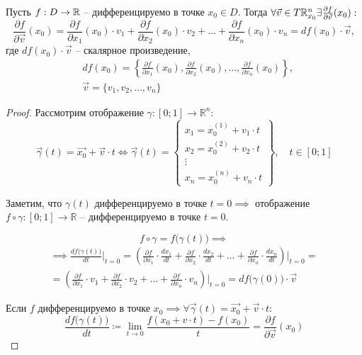 \begin{statement}
    Пусть $ f:D\rightarrow\mathbb{R} $ -- дифференцируемо в точке $ x_0\in D $. Тогда $ \forall \vec{v}\in T\mathbb{R}_{x_0}^n \exists \frac{\partial f}{\partial \vec{v}}(x_0):$
    \[
        \frac{\partial f}{\partial \vec{v}}(x_0) = \frac{\partial f}{\partial x_1}(x_0) \cdot v_1 + \frac{\partial f}{\partial x_2}(x_0) \cdot v_2 + \ldots +\frac{\partial f}{\partial x_n}(x_0) \cdot v_n = df(x_0)\cdot \vec{v},
    \] где $df(x_0)\cdot \vec{v}$ -- скалярное произведение,
    \begin{align*}
         & df(x_0) = \left\{\frac{\partial f}{\partial x_1}(x_0), \frac{\partial f}{\partial x_2}(x_0), \ldots, \frac{\partial f}{\partial x_n}(x_0)\right\}, \\
         & \vec{v} = \{v_1,v_2,\ldots,v_n\}
    \end{align*}
\end{statement}
\begin{proof}
    Рассмотрим отображение $\gamma:[0;1]\rightarrow \mathbb{R}^n$:
    \[
        \vec{\gamma}(t) = \vec{x_0} + \vec{v}\cdot t \iff \vec{\gamma}(t) = \left\{\begin{array}{l}
            x_1 = x_0^{(1)} + v_1 \cdot t \\
            x_2 = x_0^{(2)} + v_2 \cdot t \\
            \vdots                        \\
            x_n = x_0^{(n)} + v_n \cdot t
        \end{array}\right\}, \quad t \in [0;1]
    \]

    Заметим, что $\gamma(t)$ дифференцируемо в точке $t = 0 \implies$ отображение $f \circ \gamma:[0;1]\rightarrow\mathbb{R}$ -- дифференцируемо в точке $t = 0$.

    \[
        f\circ\gamma = f\big(\gamma(t)\big) \implies
    \]
    \begin{multline*}
        \implies \frac{df\big(\gamma(t)\big)}{dt}\bigg|_{t=0} = \left(\frac{\partial f}{\partial x_1} \cdot \frac{d x_1}{dt} + \frac{\partial f}{\partial x_2}\cdot\frac{dx_2}{dt} + \ldots + \frac{\partial f}{\partial x_n}\cdot\frac{dx_n}{dt}\right)\bigg|_{t=0} = \\
        = \left(\frac{\partial f}{\partial x_1} \cdot v_1 + \frac{\partial f}{\partial x_2} \cdot v_2 + \ldots + \frac{\partial f}{\partial x_n} \cdot v_n\right)\bigg|_{t=0} = df\big(\gamma(0)\big)\cdot \vec{v}
    \end{multline*}

    Если $f$ дифференцируемо в точке $x_0 \implies \forall \vec{\gamma}(t) = \vec{x_0} + \vec{v}\cdot t$:
    \[
        \frac{df\big(\gamma(t)\big)}{dt} \coloneqq \underset{t\rightarrow0}{\lim}\frac{f(x_0 + v\cdot t) - f(x_0)}{t} = \frac{\partial f}{\partial \vec{v}}(x_0)
    \]
\end{proof}

